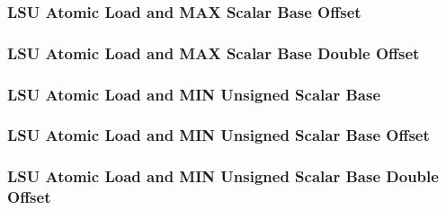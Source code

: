 

\subsubsection[{\small LSU Atomic Load and MAX Scalar Base Offset}]{LSU Atomic Load and MAX Scalar Base Offset} \label{sec:format-LSU-ALMAXSB.O}



\subsubsection[{\small LSU Atomic Load and MAX Scalar Base Double Offset}]{LSU Atomic Load and MAX Scalar Base Double Offset} \label{sec:format-LSU-ALMAXSB.D}



\subsubsection[{\small LSU Atomic Load and MIN Unsigned Scalar Base}]{LSU Atomic Load and MIN Unsigned Scalar Base} \label{sec:format-LSU-ALMINUSB}



\subsubsection[{\small LSU Atomic Load and MIN Unsigned Scalar Base Offset}]{LSU Atomic Load and MIN Unsigned Scalar Base Offset} \label{sec:format-LSU-ALMINUSB.O}



\subsubsection[{\small LSU Atomic Load and MIN Unsigned Scalar Base Double Offset}]{LSU Atomic Load and MIN Unsigned Scalar Base Double Offset} \label{sec:format-LSU-ALMINUSB.D}

